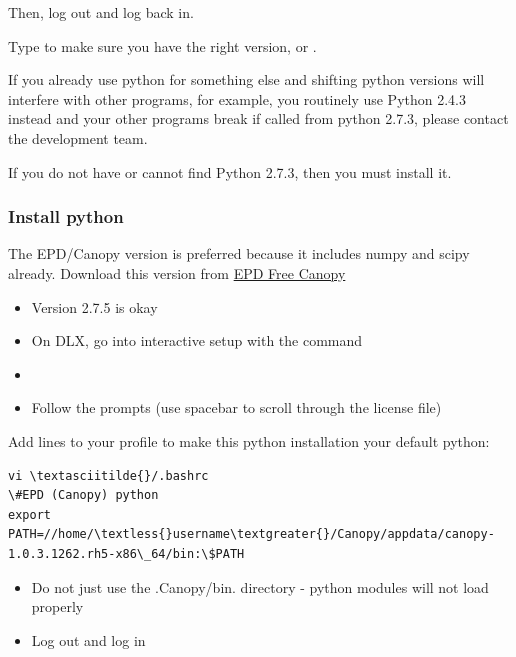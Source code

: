 \documentclass[letterpaper,10pt,english]{sphinxmanual}
\begin{document}
Then, log out and log back in.

Type  to make sure you have the right version, or .

If you already use python for something else and shifting python versions will interfere with other programs, for example, you routinely use Python 2.4.3 instead and your other programs break if called from python 2.7.3, please contact the development team.

If you do not have or cannot find Python 2.7.3, then you must install it.


\subsubsection{Install python}
\label{1_0_installation:install-python}
The EPD/Canopy version is preferred because it includes numpy and scipy already. Download this version from \href{https://www.enthought.com/downloads/}{EPD Free Canopy}
\begin{itemize}
\item {} 
Version 2.7.5 is okay

\item {} 
On DLX, go into interactive setup with the command 

\item {} 

\item {} 
Follow the prompts (use spacebar to scroll through the license file)

\end{itemize}

Add lines to your profile to make this python installation your default python:

\begin{Verbatim}[commandchars=\\\{\}]
vi \textasciitilde{}/.bashrc
\#EPD (Canopy) python
export PATH=//home/\textless{}username\textgreater{}/Canopy/appdata/canopy-1.0.3.1262.rh5-x86\_64/bin:\$PATH
\end{Verbatim}
\begin{itemize}
\item {} 
Do not just use the .Canopy/bin. directory - python modules will not load properly

\item {} 
Log out and log in

\end{itemize}
\end{document}

